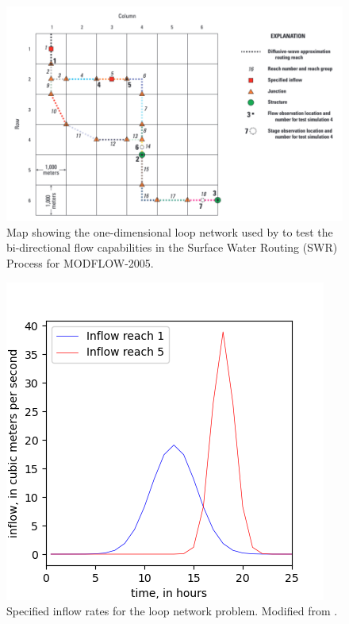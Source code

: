 \documentclass[fleqn]{article}
\begin{document}
\begin{figure}
	\centering
	\includegraphics[scale=0.40]{figures/loop_network.png}
	\caption[Map of the one-dimensional loop network.]{Map showing the one-dimensional loop network used by \cite{hughes2012documentation} to test the bi-directional flow capabilities in the Surface Water Routing (SWR) Process for MODFLOW-2005.}
	\label{fig:loop_network}
\end{figure}

\begin{figure}
	\centering
	\includegraphics[scale=0.70]{figures/loop_network_inflow.png}
	\caption[Specified inflow rates for the loop network problem.]{Specified inflow rates for the loop network problem.  Modified from  \cite{hughes2012documentation}.}
	\label{fig:loop_network_inflow}
\end{figure}
\end{document}

